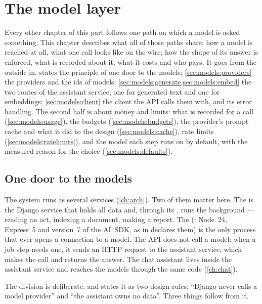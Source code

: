 \chapter{The model layer}\label{ch:models}

Every other chapter of this part follows one path on which a model is asked something. This
chapter describes what all of those paths share: how a model is reached at all, what one call
looks like on the wire, how the shape of its answer is enforced, what is recorded about it,
what it costs and who pays. It goes from the outside in.  states the
principle of one door to the models; \cref{sec:models:providers} the providers and the ids of
models; \cref{sec:models:generate,sec:models:embed} the two routes of the assistant service,
one for generated text and one for embeddings; \cref{sec:models:client} the client the API
calls them with, and its error handling. The second half is about money and limits: what is
recorded for a call (\cref{sec:models:usage}), the budgets (\cref{sec:models:budgets}), the
provider's prompt cache and what it did to the design (\cref{sec:models:cache}), rate limits
(\cref{sec:models:ratelimits}), and the model each step runs on by default, with the measured
reason for the choice (\cref{sec:models:defaults}).


\section{One door to the models}\label{sec:models:door}

The system runs as several services (\cref{ch:arch}). Two of them matter here. The
 is the Django service that holds all data and, through its , runs the
background  --- reading an act, indexing a document, making a report. The
 (: Node~24, Express~5 and version~7 of
the AI~SDK, as  in  declares them) is the only process
that ever opens a connection to a model. The API does not call a model: when a job step
needs one, it sends an HTTP request to the assistant service, which makes the call and
returns the answer. The chat assistant lives inside the assistant service and reaches the
models through the same code (\cref{ch:chat}).

The division is deliberate, and  states it as two design rules:
\enquote{Django never calls a model provider} and \enquote{the assistant owns no data}.
Three things follow from it.

